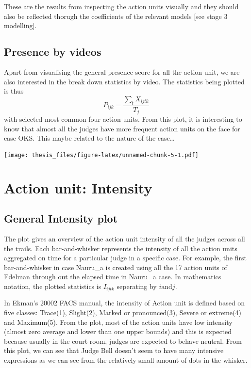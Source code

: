 \documentclass{monashthesis}
\begin{document}
These are the results from inspecting the action units visually and they should also be reflected thorugh the coefficients of the relevant models {[}see stage 3 modelling{]}.

\hypertarget{presence-by-videos}{%
\subsection{Presence by videos}\label{presence-by-videos}}

Apart from visualising the general presence score for all the action unit, we are also interested in the break down statistics by video. The statistics being plotted is thus \[P_{ijk} = \frac{\sum_{t}X_{ijtk}}{T_j}\] with selected most common four action units. From this plot, it is interesting to know that almost all the judges have more frequent action units on the face for case OKS. This maybe related to the nature of the case\ldots{}

\texttt{[image: thesis\_files/figure-latex/unnamed-chunk-5-1.pdf]}

\hypertarget{action-unit-intensity}{%
\section{Action unit: Intensity}\label{action-unit-intensity}}

\hypertarget{general-intensity-plot}{%
\subsection{General Intensity plot}\label{general-intensity-plot}}

The plot gives an overview of the action unit intensity of all the judges across all the trails. Each bar-and-whisker represents the intensity of all the action units aggregated on time for a particular judge in a specific case. For example, the first bar-and-whisker in case Nauru\_a is created using all the 17 action units of Edelman through out the elapsed time in Nauru\_a case. In mathematics notation, the plotted statistics is \(I_{ijtk}\) seperating by \(i \text{and} j\).

In Ekman's 20002 FACS manual, the intensity of Action unit is defined based on five classes: Trace(1), Slight(2), Marked or pronounced(3), Severe or extreme(4) and Maximum(5). From the plot, most of the action units have low intensity (almost zero average and lower than one upper bounds) and this is expected because usually in the court room, judges are expected to behave neutral. From this plot, we can see that Judge Bell doesn't seem to have many intensive expressions as we can see from the relatively small amount of dots in the whisker.
\end{document}
